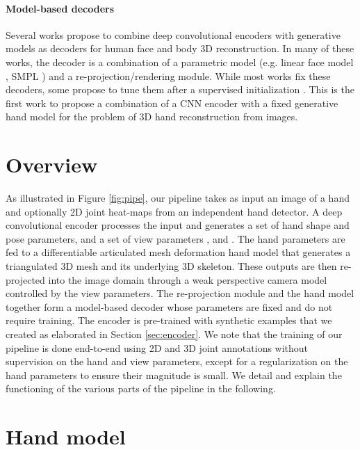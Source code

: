 \documentclass[10pt,twocolumn,letterpaper]{article}
\begin{document}
\paragraph{Model-based decoders}
\vspace{-10pt}
Several works propose to combine deep convolutional encoders with generative models as decoders for human face \cite{tewari2017mofa,tewari2017self} and body \cite{kanazawa2018end,tung2017self} 3D reconstruction. In many of these works, the decoder is a combination of a parametric model (e.g. linear face model \cite{blanz1999morphable}, SMPL \cite{SMPL:2015}) and a re-projection/rendering module. While most works fix these decoders, some propose to tune them after a supervised initialization \cite{abrevaya2018multilinear,laine2017production,tewari2017self}. This is the first work to propose a combination of a CNN encoder with a fixed generative hand model \cite{romero2017embodied} for the problem of 3D hand reconstruction from images.         


\section{Overview}

As illustrated in Figure \ref{fig:pipe}, our pipeline takes as input an image of a hand and optionally 2D joint heat-maps from an independent hand detector. A deep convolutional encoder processes the input and generates a set of hand shape  and pose  parameters, and a set of view parameters ,  and . The hand parameters are fed to a differentiable articulated mesh deformation hand model that generates a triangulated 3D mesh and its underlying 3D skeleton. These outputs are then re-projected into the image domain through a weak perspective camera model controlled by the view parameters. The re-projection module and the hand model together form a model-based decoder whose parameters are fixed and do not require training. The encoder is pre-trained with synthetic examples that we created as elaborated in Section \ref{sec:encoder}. We note that the training of our pipeline is done end-to-end using 2D and 3D joint annotations without supervision on the hand and view parameters, except for a regularization on the hand parameters to ensure their magnitude is small. We detail and explain the functioning of the various parts of the pipeline in the following.  

\section{Hand model}
\end{document}

